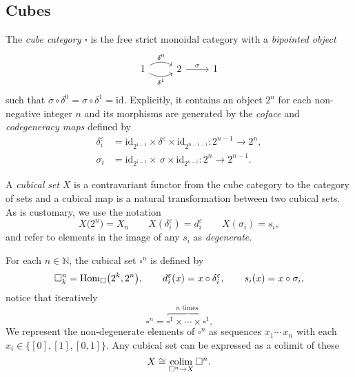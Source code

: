 
\subsection{Cubes}

The \textit{cube category} $\square$ is the free strict monoidal category with a \textit{bipointed object}
\begin{equation*}
\begin{tikzcd}
1 \arrow[r, bend left, "\delta^0"] \arrow[r, bend right, "\delta^1"'] & 2 \arrow[r, "\sigma"] & 1
\end{tikzcd}
\end{equation*}
such that $\sigma \circ \delta^0 = \sigma \circ \delta^1 = \mathrm{id}$. Explicitly, it contains an object $2^n$ for each non-negative integer $n$ and its morphisms are generated by the \textit{coface} and \textit{codegeneracy maps} defined by
\begin{align*}
\delta_i^\varepsilon & = \mathrm{id}_{2^{i-1}} \times \delta^\varepsilon \times \mathrm{id}_{2^{n-1-i}} \colon 2^{n-1} \to 2^n, \\
\sigma_i & = \mathrm{id}_{2^{i-1}} \times \, \sigma \times \mathrm{id}_{2^{n-i}} \colon 2^{n} \to 2^{n-1}.
\end{align*}

A \textit{cubical set} $X$ is a contravariant functor from the cube category to the category of sets and a cubical map is a natural transformation between two cubical sets. As is customary, we use the notation
\begin{equation*}
X\big( 2^n \big) = X_n \qquad X(\delta^\varepsilon_i) = d^\varepsilon_i \qquad X(\sigma_i) = s_i,
\end{equation*}
and refer to elements in the image of any $s_i$ as \textit{degenerate}.

For each $n \in \mathbb{N}$, the cubical set $\square^n$ is defined by
\begin{equation*}
\square^n_k  = \mathrm{Hom}_{\square} \big( 2^k, 2^n \big), \qquad 
d^\varepsilon_i(x) = x \circ \delta^\varepsilon_i, \qquad 
s_i(x) = x \circ \sigma_i,
\end{equation*}
notice that iteratively
\begin{equation*}
\square^n = \overbrace{\square^1 \times \cdots \times \square^1}^{n \text{ times }}.
\end{equation*}
We represent the non-degenerate elements of $\square^n$ as sequences $x_1 \cdots\, x_n$ with each $x_i \in \{[0], [1], [0,1]\}$. Any cubical set can be expressed as a colimit of these
\begin{equation*}
X \cong \operatorname*{colim}_{\square^n \to X} \square^n.
\end{equation*}

